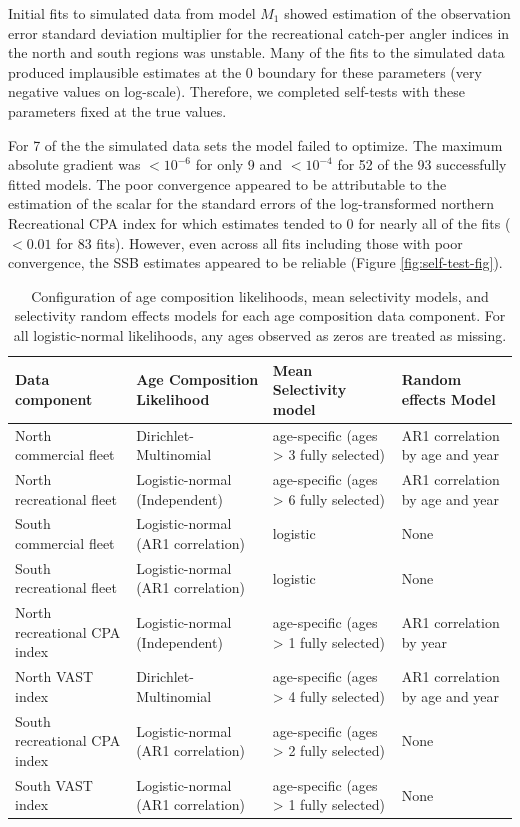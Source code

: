 \documentclass[
]{article}
\begin{document}
Initial fits to simulated data from model \(M_1\) showed estimation of
the observation error standard deviation multiplier for the recreational
catch-per angler indices in the north and south regions was unstable.
Many of the fits to the simulated data produced implausible estimates at
the 0 boundary for these parameters (very negative values on log-scale).
Therefore, we completed self-tests with these parameters fixed at the
true values.

For 7 of the the simulated data sets the model failed to optimize. The
maximum absolute gradient was \(<10^{-6}\) for only 9 and \(<10^{-4}\)
for 52 of the 93 successfully fitted models. The poor convergence
appeared to be attributable to the estimation of the scalar for the
standard errors of the log-transformed northern Recreational CPA index
for which estimates tended to 0 for nearly all of the fits (\(<0.01\)
for 83 fits). However, even across all fits including those with poor
convergence, the SSB estimates appeared to be reliable (Figure
\ref{fig:self-test-fig}).

\setcounter{table}{0}
\renewcommand\thetable{S\arabic{table}}

\begin{landscape}\begin{table}

\caption{\label{tab:age-comp-sel-table}Configuration of age composition likelihoods, mean selectivity models, and selectivity random effects models for each age composition data component. For all logistic-normal likelihoods, any ages observed as zeros are treated as missing.}
\centering
\begin{tabular}[t]{llll}
\toprule
Data component & Age Composition Likelihood & Mean Selectivity model & Random effects Model\\
\midrule
North commercial fleet & Dirichlet-Multinomial & age-specific (ages > 3 fully selected) & AR1 correlation by age and year\\
North recreational fleet & Logistic-normal (Independent) & age-specific (ages > 6 fully selected) & AR1 correlation by age and year\\
South commercial fleet & Logistic-normal (AR1 correlation) & logistic & None\\
South recreational fleet & Logistic-normal (AR1 correlation) & logistic & None\\
North recreational CPA index & Logistic-normal (Independent) & age-specific (ages > 1 fully selected) & AR1 correlation by year\\
\addlinespace
North VAST index & Dirichlet-Multinomial & age-specific (ages > 4 fully selected) & AR1 correlation by age and year\\
South recreational CPA index & Logistic-normal (AR1 correlation) & age-specific (ages > 2 fully selected) & None\\
South VAST index & Logistic-normal (AR1 correlation) & age-specific (ages > 1 fully selected) & None\\
\bottomrule
\end{tabular}
\end{table}
\end{landscape}
\end{document}
